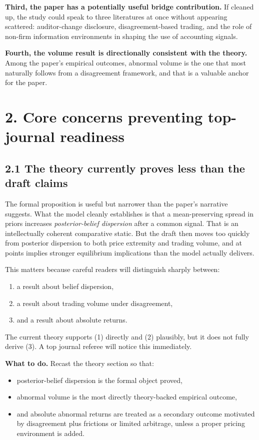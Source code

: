 \textbf{Third, the paper has a potentially useful bridge contribution.} If cleaned up, the study could speak to three literatures at once without appearing scattered: auditor-change disclosure, disagreement-based trading, and the role of non-firm information environments in shaping the use of accounting signals.

\textbf{Fourth, the volume result is directionally consistent with the theory.} Among the paper's empirical outcomes, abnormal volume is the one that most naturally follows from a disagreement framework, and that is a valuable anchor for the paper.

\section*{2. Core concerns preventing top-journal readiness}

\subsection*{2.1 The theory currently proves less than the draft claims}

The formal proposition is useful but narrower than the paper's narrative suggests. What the model cleanly establishes is that a mean-preserving spread in priors increases \emph{posterior-belief dispersion} after a common signal. That is an intellectually coherent comparative static. But the draft then moves too quickly from posterior dispersion to both price extremity and trading volume, and at points implies stronger equilibrium implications than the model actually delivers.

This matters because careful readers will distinguish sharply between:
\begin{enumerate}[leftmargin=1.5em]
    \item a result about belief dispersion,
    \item a result about trading volume under disagreement,
    \item and a result about absolute returns.
\end{enumerate}

The current theory supports (1) directly and (2) plausibly, but it does not fully derive (3). A top journal referee will notice this immediately.

\textbf{What to do.} Recast the theory section so that:
\begin{itemize}[leftmargin=1.5em]
    \item posterior-belief dispersion is the formal object proved,
    \item abnormal volume is the most directly theory-backed empirical outcome,
    \item and absolute abnormal returns are treated as a secondary outcome motivated by disagreement plus frictions or limited arbitrage, unless a proper pricing environment is added.
\end{itemize}

